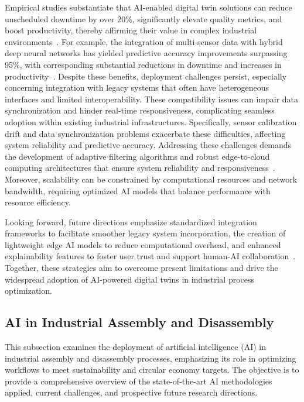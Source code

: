 \documentclass[sigconf]{acmart}
\begin{document}
Empirical studies substantiate that AI-enabled digital twin solutions can reduce unscheduled downtime by over 20\%, significantly elevate quality metrics, and boost productivity, thereby affirming their value in complex industrial environments~\cite{ref31,ref36}. For example, the integration of multi-sensor data with hybrid deep neural networks has yielded predictive accuracy improvements surpassing 95\%, with corresponding substantial reductions in downtime and increases in productivity~\cite{ref45}. Despite these benefits, deployment challenges persist, especially concerning integration with legacy systems that often have heterogeneous interfaces and limited interoperability. These compatibility issues can impair data synchronization and hinder real-time responsiveness, complicating seamless adoption within existing industrial infrastructures. Specifically, sensor calibration drift and data synchronization problems exacerbate these difficulties, affecting system reliability and predictive accuracy. Addressing these challenges demands the development of adaptive filtering algorithms and robust edge-to-cloud computing architectures that ensure system reliability and responsiveness~\cite{ref34}. Moreover, scalability can be constrained by computational resources and network bandwidth, requiring optimized AI models that balance performance with resource efficiency.

Looking forward, future directions emphasize standardized integration frameworks to facilitate smoother legacy system incorporation, the creation of lightweight edge AI models to reduce computational overhead, and enhanced explainability features to foster user trust and support human-AI collaboration~\cite{ref33,ref38}. Together, these strategies aim to overcome present limitations and drive the widespread adoption of AI-powered digital twins in industrial process optimization.

\subsection{AI in Industrial Assembly and Disassembly}

This subsection examines the deployment of artificial intelligence (AI) in industrial assembly and disassembly processes, emphasizing its role in optimizing workflows to meet sustainability and circular economy targets. The objective is to provide a comprehensive overview of the state-of-the-art AI methodologies applied, current challenges, and prospective future research directions.
\end{document}
